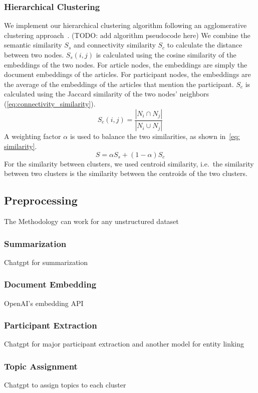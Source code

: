 \subsubsection{Hierarchical Clustering}\label{sec: clustering}
We implement our hierarchical clustering algorithm following an agglomerative clustering approach~\cite{steinbach2000doccluster}.
(TODO: add algorithm pseudocode here)
We combine the semantic similarity $S_s$ and connectivity similarity $S_c$ to calculate the distance between two nodes.
$S_s(i, j)$ is calculated using the cosine similarity of the embeddings of the two nodes.
For article nodes, the embeddings are simply the document embeddings of the articles.
For participant nodes, the embeddings are the average of the embeddings of the articles that mention the participant.
$S_c$ is calculated using the Jaccard similarity of the two nodes' neighbors (\autoref{eq:connectivity_similarity}).
\begin{equation}\label{eq:connectivity_similarity}
    S_c(i, j) = \frac{|N_i \cap N_j|}{|N_i \cup N_j|}
\end{equation}
A weighting factor $\alpha$ is used to balance the two similarities, as shown in~\autoref{eq: similarity}.
\begin{equation}\label{eq: similarity}
    S = \alpha S_s + (1-\alpha) S_c
\end{equation}
For the similarity between clusters, we used centroid similarity, i.e.\ the similarity between two clusters is the similarity between the centroids of the two clusters.



\subsection{Preprocessing}
The Methodology can work for any unstructured dataset
\subsubsection{Summarization}
Chatgpt for summarization
\subsubsection{Document Embedding}
OpenAI's embedding API
\subsubsection{Participant Extraction}\label{sec:participant_extraction}
Chatgpt for major participant extraction and another model for entity linking

\subsubsection{Topic Assignment}
Chatgpt to assign topics to each cluster